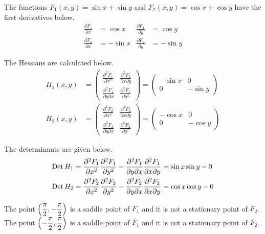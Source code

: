\begin{answer}
	The functions $F_1(x,y) = \sin x + \sin y$ and $F_2(x,y) = \cos x + \cos y$ have the first derivatives below.
	\begin{align*}
		\frac{\partial F_1}{\partial x} & = \cos x  & \frac{\partial F_1}{\partial y} & = \cos y  \\
		\frac{\partial F_2}{\partial x} & = -\sin x & \frac{\partial F_2}{\partial y} & = -\sin y
	\end{align*}

	The Hessians are calculated below.
	\begin{align*}
		H_1(x,y) & =
		\begin{pmatrix}
			\frac{\partial^2 F_1}{\partial x^2}          & \frac{\partial^2 F_1}{\partial x \partial y} \\
			\frac{\partial^2 F_1}{\partial y \partial x} & \frac{\partial^2 F_1}{\partial y^2}
		\end{pmatrix}
		=
		\begin{pmatrix}
			- \sin x & 0       \\
			0        & -\sin y
		\end{pmatrix}
		\\
		H_2(x,y) & =
		\begin{pmatrix}
			\frac{\partial^2 F_2}{\partial x^2}          & \frac{\partial^2 F_2}{\partial x \partial y} \\
			\frac{\partial^2 F_2}{\partial y \partial x} & \frac{\partial^2 F_2}{\partial y^2}
		\end{pmatrix}
		=
		\begin{pmatrix}
			- \cos x & 0        \\
			0        & - \cos y
		\end{pmatrix}
	\end{align*}

	The determinants are given below.
	\begin{align*}
		\operatorname{Det} H_1 & = \frac{\partial^2 F_1}{\partial x^2} \frac{\partial^2 F_1}{\partial y^2} - \frac{\partial^2 F_1}{\partial y \partial x}\frac{\partial^2 F_1}{\partial x \partial y} = \sin x \sin y - 0 \\
		\operatorname{Det} H_2 & = \frac{\partial^2 F_2}{\partial x^2} \frac{\partial^2 F_2}{\partial y^2} - \frac{\partial^2 F_2}{\partial y \partial x}\frac{\partial^2 F_2}{\partial x \partial y} = \cos x \cos y - 0
	\end{align*}

	The point $\displaystyle \left(\frac{\pi}{2}, -\frac{\pi}{2}\right)$ is a saddle point of $F_1$ and it is not a stationary point of $F_2$.
	The point $\displaystyle \left(-\frac{\pi}{2}, \frac{\pi}{2}\right)$ is a saddle point of $F_1$ and it is not a stationary point of $F_2$.


\end{answer}
